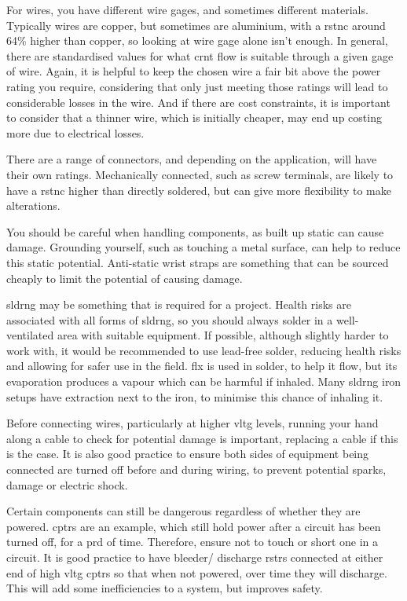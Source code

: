 \documentclass[a4paper,11pt]{report}
\begin{document}
For wires, you have different wire \gls{gage}s, and sometimes different materials. Typically wires are copper, but sometimes are aluminium, with a \gls{rstnc} around 64\% higher than copper, so looking at wire \gls{gage} alone isn't enough. In general, there are standardised values for what \gls{crnt} flow is suitable through a given \gls{gage} of wire. Again, it is helpful to keep the chosen wire a fair bit above the power rating you require, considering that only just meeting those ratings will lead to considerable losses in the wire. And if there are cost constraints, it is important to consider that a thinner wire, which is initially cheaper, may end up costing more due to electrical losses.

There are a range of connectors, and depending on the application, will have their own ratings. Mechanically connected, such as screw terminals, are likely to have a \gls{rstnc} higher than directly soldered, but can give more flexibility to make alterations.

You should be careful when handling components, as built up static can cause damage. Grounding yourself, such as touching a metal surface, can help to reduce this static potential. Anti-static wrist straps are something that can be sourced cheaply to limit the potential of causing damage.

\gls{sldrng} may be something that is required for a project. Health risks are associated with all forms of \gls{sldrng}, so you should always solder in a well-ventilated area with suitable equipment. If possible, although slightly harder to work with, it would be recommended to use lead-free solder, reducing health risks and allowing for safer use in the field. \gls{flx} is used in solder, to help it flow, but its evaporation produces a vapour which can be harmful if inhaled. Many \gls{sldrng} iron setups have extraction next to the iron, to minimise this chance of inhaling it.

Before connecting wires, particularly at higher \gls{vltg} levels, running your hand along a cable to check for potential damage is important, replacing a cable if this is the case. It is also good practice to ensure both sides of equipment being connected are turned off before and during wiring, to prevent potential sparks, damage or electric shock.

Certain components can still be dangerous regardless of whether they are powered. \gls{cptr}s are an example, which still hold power after a circuit has been turned off, for a \gls{prd} of time. Therefore, ensure not to touch or short one in a circuit. It is good practice to have bleeder/ discharge \gls{rstr}s connected at either end of high \gls{vltg} \gls{cptr}s so that when not powered, over time they will discharge. This will add some inefficiencies to a system, but improves safety.
\end{document}
